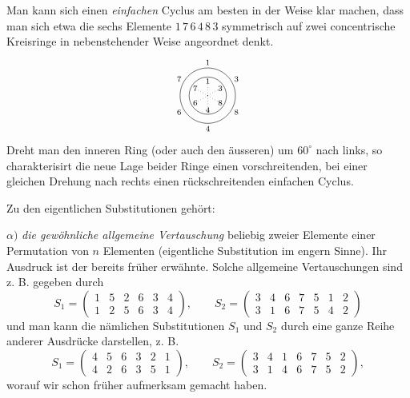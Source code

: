 \documentclass[10pt]{article}
\begin{document}
Man kann sich einen \emph{einfachen} Cyclus am besten in der Weise klar machen, dass man sich etwa die sechs Elemente \(1\,7\,6\,4\,8\,3\) symmetrisch auf zwei concentrische Kreisringe in nebenstehender Weise angeordnet denkt.
\[
\begin{tikzpicture}[scale=0.38,baseline=-0.5ex]
\draw (0,0) circle (2.3);
\draw (0,0) circle (1.55);
\foreach \a in {30,90,150,210,270,330}{\draw[dotted] (0,0)--(\a:1.55);}
\node at (90:2.75) {\scriptsize 1};
\node at (30:2.75) {\scriptsize 3};
\node at (-30:2.75) {\scriptsize 8};
\node at (-90:2.75) {\scriptsize 4};
\node at (-150:2.75) {\scriptsize 6};
\node at (150:2.75) {\scriptsize 7};
\node at (90:1.2) {\scriptsize 1};
\node at (30:1.2) {\scriptsize 3};
\node at (-30:1.2) {\scriptsize 8};
\node at (-90:1.2) {\scriptsize 4};
\node at (-150:1.2) {\scriptsize 6};
\node at (150:1.2) {\scriptsize 7};
\end{tikzpicture}
\]
Dreht man den inneren Ring (oder auch den äusseren) um \(60^\circ\) nach links, so charakterisirt die neue Lage beider Ringe einen vorschreitenden, bei einer gleichen Drehung nach rechts einen rückschreitenden einfachen Cyclus.

Zu den eigentlichen Substitutionen gehört:

\(\alpha)\) \emph{die gewöhnliche allgemeine Vertauschung} beliebig zweier Elemente einer Permutation von \(n\) Elementen (eigentliche Substitution im engern Sinne). Ihr Ausdruck ist der bereits früher erwähnte. Solche allgemeine Vertauschungen sind z. B. gegeben durch
\[
S_1=\begin{pmatrix}1&5&2&6&3&4\\1&2&5&6&3&4\end{pmatrix},\qquad
S_2=\begin{pmatrix}3&4&6&7&5&1&2\\3&1&6&7&5&4&2\end{pmatrix}
\]
und man kann die nämlichen Substitutionen \(S_1\) und \(S_2\) durch eine ganze Reihe anderer Ausdrücke darstellen, z. B.
\[
S_1=\begin{pmatrix}4&5&6&3&2&1\\4&2&6&3&5&1\end{pmatrix},\qquad
S_2=\begin{pmatrix}3&4&1&6&7&5&2\\3&1&4&6&7&5&2\end{pmatrix},
\]
worauf wir schon früher aufmerksam gemacht haben.
\end{document}
